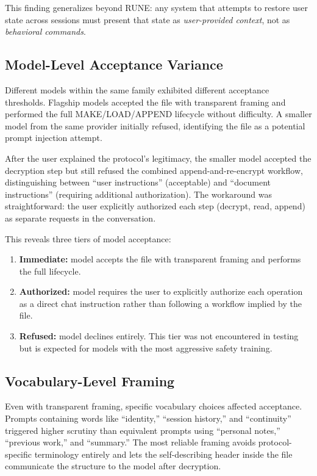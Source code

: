 \documentclass[11pt,a4paper]{article}
\begin{document}
This finding generalizes beyond RUNE: any system that attempts to restore user state across sessions must present that state as \textit{user-provided context}, not as \textit{behavioral commands}.

\subsection{Model-Level Acceptance Variance}

Different models within the same family exhibited different acceptance thresholds. Flagship models accepted the file with transparent framing and performed the full MAKE/LOAD/APPEND lifecycle without difficulty. A smaller model from the same provider initially refused, identifying the file as a potential prompt injection attempt.

After the user explained the protocol's legitimacy, the smaller model accepted the decryption step but still refused the combined append-and-re-encrypt workflow, distinguishing between ``user instructions'' (acceptable) and ``document instructions'' (requiring additional authorization). The workaround was straightforward: the user explicitly authorized each step (decrypt, read, append) as separate requests in the conversation.

This reveals three tiers of model acceptance:

\begin{enumerate}
    \item \textbf{Immediate:} model accepts the file with transparent framing and performs the full lifecycle.
    \item \textbf{Authorized:} model requires the user to explicitly authorize each operation as a direct chat instruction rather than following a workflow implied by the file.
    \item \textbf{Refused:} model declines entirely. This tier was not encountered in testing but is expected for models with the most aggressive safety training.
\end{enumerate}

\subsection{Vocabulary-Level Framing}

Even with transparent framing, specific vocabulary choices affected acceptance. Prompts containing words like ``identity,'' ``session history,'' and ``continuity'' triggered higher scrutiny than equivalent prompts using ``personal notes,'' ``previous work,'' and ``summary.'' The most reliable framing avoids protocol-specific terminology entirely and lets the self-describing header inside the file communicate the structure to the model after decryption.
\end{document}
